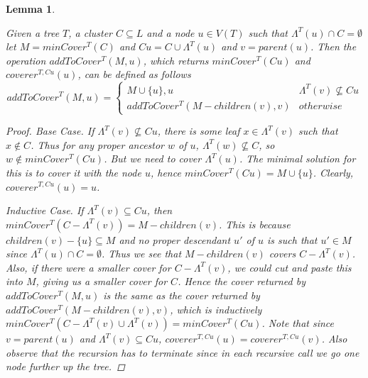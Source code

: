 \documentclass{article}
\newcommand{\leafset}{\Lambda}
\newtheorem{mincoverrecursive}[incompatibility]{Lemma}
\begin{document}
    \begin{mincoverrecursive}
        \label{lem:mincoverrecursive}

        Given a tree $T$, a cluster $C \subseteq L$ and a node $u \in V(T)$ such that $\leafset^{T}(u) \cap C = \emptyset$ let $M = minCover^{T}(C)$ and $Cu = C \cup \leafset^{T}(u)$ and $v = parent(u)$. Then the operation $addToCover^{T}(M, u)$, which returns $minCover^{T}(Cu)$ and $coverer^{T, Cu}(u)$, can be defined as follows \[addToCover^{T}(M, u) =
        \begin{cases}
            M \cup \{u\}, u & \leafset^{T}(v) \not\subseteq Cu\\
            addToCover^{T}(M - children(v), v) & otherwise
        \end{cases}\]

        \begin{proof}
            \textit{Base Case.} If $\leafset^{T}(v) \not\subseteq Cu$, there is some leaf $x \in \leafset^{T}(v)$ such that $x \not\in C$. Thus for any proper ancestor $w$ of $u$, $\leafset^{T}(w) \not\subseteq C$, so $w \not\in minCover^{T}(Cu)$. But we need to cover $\leafset^{T}(u)$. The minimal solution for this is to cover it with the node $u$, hence $minCover^{T}(Cu) = M \cup \{u\}$. Clearly, $coverer^{T, Cu}(u) = u$.

            \textit{Inductive Case.} If $\leafset^{T}(v) \subseteq Cu$, then $minCover^{T}(C - \leafset^{T}(v)) = M - children(v)$. This is because $children(v) - \{u\} \subseteq M$ and no proper descendant $u'$ of $u$ is such that $u' \in M$ since $\leafset^{T}(u) \cap C = \emptyset$. Thus we see that $M - children(v)$ covers $C - \leafset^{T}(v)$. Also, if there were a smaller cover for $C - \leafset^{T}(v)$, we could cut and paste this into $M$, giving us a smaller cover for $C$. Hence the cover returned by $addToCover^{T}(M, u)$ is the same as the cover returned by $addToCover^{T}(M - children(v), v)$, which is inductively $minCover^{T}(C - \leafset^{T}(v) \cup \leafset^{T}(v)) = minCover^{T}(Cu)$. Note that since $v = parent(u)$ and $\leafset^{T}(v) \subseteq Cu$, $coverer^{T, Cu}(u) = coverer^{T, Cu}(v)$. Also observe that the recursion has to terminate since in each recursive call we go one node further up the tree.
        \end{proof}
    \end{mincoverrecursive}
\end{document}
